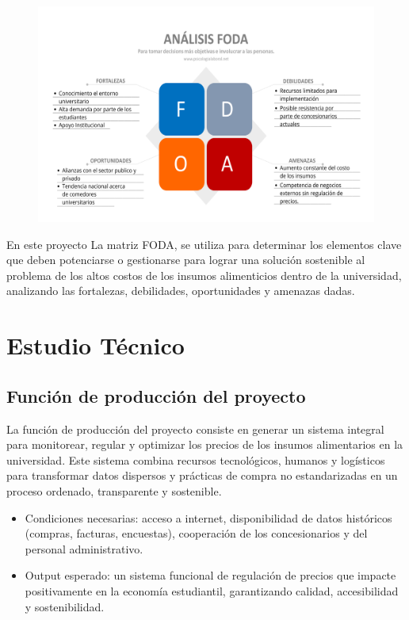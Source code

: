 \documentclass[letterpaper, 11pt]{report}
\begin{document}
\begin{figure}[H]
      \begin{center}
            \includegraphics[width=\linewidth]{./Images/matrix_foda.png}
            \caption{}
      \end{center}
\end{figure}

En este proyecto La matriz FODA, se utiliza para determinar los elementos clave
que deben potenciarse o gestionarse para lograr una solución sostenible al
problema de los altos costos de los insumos alimenticios dentro de la
universidad, analizando las fortalezas, debilidades, oportunidades y amenazas
dadas.

\section{Estudio Técnico}

\subsection{Función de producción del proyecto}

La función de producción del proyecto consiste en generar un sistema integral
para monitorear, regular y optimizar los precios de los insumos alimentarios en
la universidad. Este sistema combina recursos tecnológicos, humanos y
logísticos para transformar datos dispersos y prácticas de compra no
estandarizadas en un proceso ordenado, transparente y sostenible.

\begin{itemize}
      \item Condiciones necesarias: acceso a internet, disponibilidad de datos históricos
            (compras, facturas, encuestas), cooperación de los concesionarios y del
            personal administrativo.
      \item Output esperado: un sistema funcional de regulación de precios que impacte
            positivamente en la economía estudiantil, garantizando calidad, accesibilidad y
            sostenibilidad.

\end{itemize}
\end{document}
